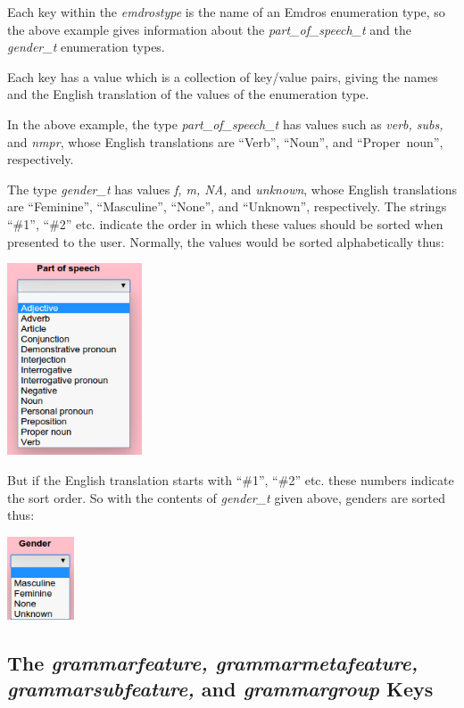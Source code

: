 \documentclass[11pt,oneside,a4paper]{memoir}
\begin{document}
Each key within the \emph{emdrostype} is the name of an Emdros enumeration type, so the above
example gives information about the \emph{part\_of\_speech\_t} and the \emph{gender\_t} enumeration
types.

Each key has a value which is a collection of key/value pairs, giving the names and the English
translation of the values of the enumeration type.

In the above example, the type \emph{part\_of\_speech\_t} has values such as \emph{verb, subs,} and
\emph{nmpr}, whose English translations are ``Verb'', ``Noun'', and ``Proper~noun'', respectively.

The type \emph{gender\_t} has values \emph{f, m, NA,} and \emph{unknown}, whose English translations
are ``Feminine'', ``Masculine'', ``None'', and ``Unknown'', respectively. The strings ``\#1'', ``\#2''
etc. indicate the order in which these values should be sorted when presented to the user. Normally,
the values would be sorted alphabetically thus:

\begin{center}
  \includegraphics[width=0.3\textwidth]{psp.png}
\end{center}

But if the English translation starts with ``\#1'', ``\#2'' etc. these numbers indicate the sort
order. So with the contents of \emph{gender\_t} given above, genders are sorted thus:

\begin{center}
  \includegraphics[width=0.148\textwidth]{gender.png}
\end{center}


\subsection{The \emph{grammarfeature, grammarmetafeature, grammarsubfeature,} and
  \emph{grammargroup} Keys}\label{grammar-loc}
\end{document}
